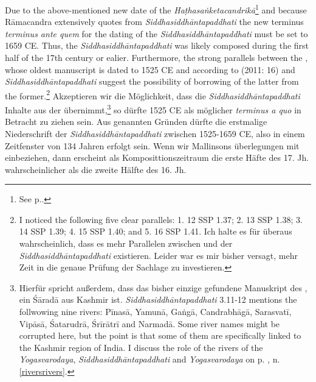 Due to the above-mentioned new date of the \textit{Haṭhasaṅketacandrikā}\footnote{See p.\pageref{dating}.} and because Rāmacandra extensively quotes from \textit{Siddhasiddhāntapaddhati} the new terminus \textit{terminus ante quem} for the dating of the \textit{Siddhasiddhāntapaddhati} must be set to 1659 CE. Thus, the \textit{Siddhasiddhāntapaddhati} was likely composed during the first half of the 17th century or ealier. Furthermore, the strong parallels between the , whose oldest manuscript is dated to 1525 CE and according to \citeauthor{mallinsonnath} (2011: 16) and \textit{Siddhasiddhāntapaddhati} suggest the possibility of borrowing of the latter from the former.\footnote{I noticed the following five clear parallels: 1.  12 \approx SSP 1.37; 2.  13 \approx SSP 1.38; 3.  14 \approx SSP 1.39; 4.  15 \approx SSP 1.40; and 5.  16 \approx SSP 1.41. Ich halte es für überaus wahrscheinlich, dass es mehr Parallelen zwischen  und der \textit{Siddhasiddhāntapaddhati} existieren. Leider war es mir bisher versagt, mehr Zeit in die genaue Prüfung der Sachlage zu investieren.} Akzeptieren wir die Möglichkeit, dass die \textit{Siddhasiddhāntapaddhati} Inhalte aus der  übernimmt,\footnote{Hierfür spricht außerdem, dass das bisher einzige gefundene Manuskript des , ein Śāradā aus Kashmir ist. \textit{Siddhasiddhāntapaddhati} 3.11-12 mentions the follwowing nine rivers: Pīnasā, Yamunā, Gaṅgā, Candrabhāgā, Sarasvatī, Vipāsā, Śatarudrā, Śrīrātrī and Narmadā. Some river names might be corrupted here, but the point is that some of them are specifically linked to the Kashmir region of India. I discuss the role of the rivers of the \emph{Yogasvarodaya}, \emph{Siddhasiddhāntapaddhati} and \emph{Yogasvarodaya} on p. \pageref{riversrivers}, n. \ref{riversrivers}.} so dürfte 1525 CE als möglicher \textit{terminus a quo} in Betracht zu ziehen sein. Aus genannten Gründen dürfte die erstmalige Niederschrift der \textit{Siddhasiddhāntapaddhati} zwischen 1525-1659 CE, also in einem Zeitfenster von 134 Jahren erfolgt sein. Wenn wir Mallinsons überlegungen mit einbeziehen, dann erscheint als Komposittionszeitraum die erste Häfte des 17. Jh. wahrscheinlicher als die zweite Hälfte des 16. Jh.  

